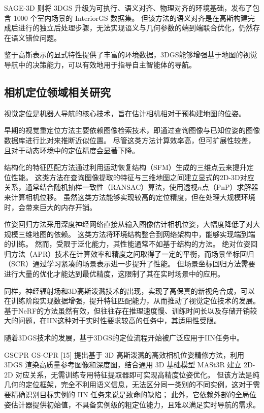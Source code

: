 SAGE-3D\cite{sage3d} 则将 3DGS 升级为可执行、语义对齐、物理对齐的环境基础，发布了包含 1000 个室内场景的 InteriorGS\cite{sage3d} 数据集。
但该方法的语义对齐是在高斯构建完成后进行的独立后处理步骤，无法实现语义与几何参数的端到端联合优化，仍然存在语义错位问题。

鉴于高斯表示的显式特性提供了丰富的环境数据，3DGS\cite{3DGS}能够增强基于地图的视觉导航中的决策能力，可以有效地用于指导自主智能体的导航。


\subsection{相机定位领域相关研究}
视觉定位是机器人导航的核心技术，旨在估计相机相对于预构建地图的位姿。

早期的视觉重定位方法主要依赖图像检索技术，即通过查询图像与已知位姿的图像数据库进行比对来推断近似位置。
尽管这类方法计算效率高，但可扩展性较差，且对于动态环境中的定位精度会显著下降。

结构化的特征匹配方法通过利用运动恢复结构（SFM）生成的三维点云来提升定位性能。
这类方法在查询图像提取的特征与三维地图之间建立显式的2D-3D对应关系，通常结合随机抽样一致性（RANSAC）算法，使用透视$n$点（PnP）求解器来计算相机位移\cite{lim2012real}。
虽然这类方法能够实现较高的定位精度，但在处理大规模环境时，会带来巨大的内存开销。

位姿回归方法采用深度神经网络直接从输入图像估计相机位姿，大幅度降低了对大规模三维地图的依赖。
这类方法将环境结构整合到网络架构中，能够实现端到端的训练。
然而，受限于泛化能力，其性能通常不如基于结构的方法。
绝对位姿回归方法（APR）技术在计算效率和精度之间取得了一定的平衡，而场景坐标回归（SCR）通过学习紧凑的场景表示进一步提升了性能。
但场景坐标回归方法需要进行大量的优化才能达到最优精度，这限制了其在实时场景中的应用\cite{sarlin2021back}。

同样，神经辐射场\cite{nerf}和3D高斯泼溅技术\cite{3DGS}的出现，实现了高保真的新视角合成，可以在训练阶段实现数据增强，提升特征匹配能力，从而推动了视觉定位技术的发展。
基于NeRF\cite{nerf}的方法虽然有效，但往往存在推理速度慢、训练时间长以及存储开销较大的问题，在IIN\cite{krantz2022instance}这种对于实时性要求较高的任务中，其适用性受限。

随着3DGS技术的发展，基于3DGS的定位流程开始被广泛应用于IIN任务中。

GSCPR\cite{GS-CPR} GS-CPR [15] 提出基于 3D 高斯泼溅的高效相机位姿精修方法，利用 3DGS 渲染高质量参考图像和深度图，结合通用 3D 基础模型 MASt3R 建立 2D-2D 对应关系，无需训练专用特征提取器即可实现高精度位姿优化。
但该方法是纯几何的定位框架，完全不利用语义信息，无法区分同一类别的不同实例，这对于需要精确识别目标实例的 IIN 任务来说是致命的缺陷；
此外，它依赖外部的全局位姿估计器提供初始值，不具备实例级的粗定位能力，且难以满足实时导航的需求。

